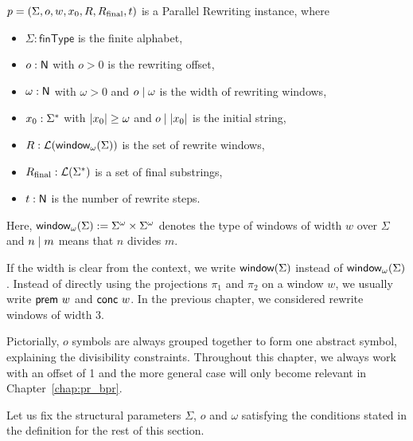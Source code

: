\begin{definition}\label{def:pr}
  $p = (\Sigma, o, w, x_0, R, R_{\text{final}}, t)$ is a Parallel Rewriting instance, where 
  \begin{itemize}
    \item $\Sigma : \textsf{finType}$ is the finite alphabet,
    \item $o : \mathsf{N}$ with $o > 0$ is the rewriting offset,
    \item $\omega : \mathsf{N}$ with $\omega > 0$ and $o \mid \omega$ is the width of rewriting windows,
    \item $x_0 : \Sigma^*$ with $|x_0| \ge \omega$ and $o \mid |x_0|$ is the initial string, 
    \item $R : \mathcal{L} (\textsf{window}_{\omega}{(\Sigma)})$ is the set of rewrite windows,
    \item $R_{\text{final}} : \mathcal{L} (\Sigma^*)$ is a set of final substrings,
    \item $t : \mathsf{N}$ is the number of rewrite steps.
  \end{itemize}
  Here, $\textsf{window}_{\omega}{(\Sigma)} := {\Sigma}^\omega \times {\Sigma}^\omega$\mnote{$\winw{\omega}{\Sigma}$} denotes the type of windows of width $w$ over $\Sigma$ and $ n \mid{} m$ means that $n$ divides $m$.
\end{definition}
If the width is clear from the context, we write $\textsf{window}{(\Sigma)}$ instead of $\winw{\omega}{\Sigma}$.
Instead of directly using the projections $\pi_1$ and $\pi_2$ on a window $w$, we usually write $\textsf{prem}~w$ and $\textsf{conc}~w$\mnote{$\prem, \conc$}. In the previous chapter, we considered rewrite windows of width 3.

Pictorially, $o$ symbols are always grouped together to form one abstract symbol, explaining the divisibility constraints. Throughout this chapter, we always work with an offset of 1 and the more general case will only become relevant in Chapter~\ref{chap:pr_bpr}.

Let us fix the structural parameters $\Sigma$, $o$ and $\omega$ satisfying the conditions stated in the definition for the rest of this section.


